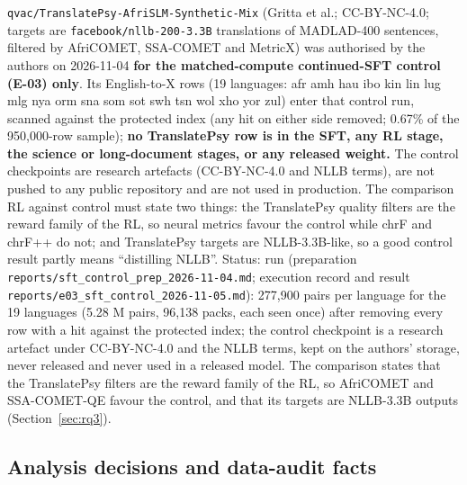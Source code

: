 \texttt{qvac/\allowbreak{}TranslatePsy-\allowbreak{}AfriSLM-\allowbreak{}Synthetic-\allowbreak{}Mix} (Gritta et al.; CC-BY-NC-4.0; targets are \texttt{facebook/\allowbreak{}nllb-\allowbreak{}200-\allowbreak{}3.\allowbreak{}3B} translations of MADLAD-400 sentences, filtered by AfriCOMET, SSA-COMET and MetricX) was authorised by the authors on 2026-11-04 \textbf{for the matched-compute continued-SFT control (E-03) only}. Its English-to-X rows (19 languages: afr amh hau ibo kin lin lug mlg nya orm sna som sot swh tsn wol xho yor zul) enter that control run, scanned against the protected index (any hit on either side removed; 0.67\% of the 950,000-row sample); \textbf{no TranslatePsy row is in the SFT, any RL stage, the science or long-document stages, or any released weight.} The control checkpoints are research artefacts (CC-BY-NC-4.0 and NLLB terms), are not pushed to any public repository and are not used in production. The comparison RL against control must state two things: the TranslatePsy quality filters are the reward family of the RL, so neural metrics favour the control while chrF and chrF++ do not; and TranslatePsy targets are NLLB-3.3B-like, so a good control result partly means ``distilling NLLB''. Status: run (preparation \texttt{reports/\allowbreak{}sft\_\allowbreak{}control\_\allowbreak{}prep\_\allowbreak{}2026-\allowbreak{}11-\allowbreak{}04.\allowbreak{}md}; execution record and result \texttt{reports/\allowbreak{}e03\_\allowbreak{}sft\_\allowbreak{}control\_\allowbreak{}2026-\allowbreak{}11-\allowbreak{}05.\allowbreak{}md}): 277,900 pairs per language for the 19 languages (5.28 M pairs, 96,138 packs, each seen once) after removing every row with a hit against the protected index; the control checkpoint is a research artefact under CC-BY-NC-4.0 and the NLLB terms, kept on the authors' storage, never released and never used in a released model. The comparison states that the TranslatePsy filters are the reward family of the RL, so AfriCOMET and SSA-COMET-QE favour the control, and that its targets are NLLB-3.3B outputs (Section~\ref{sec:rq3}).  

\subsection{Analysis decisions and data-audit facts}


